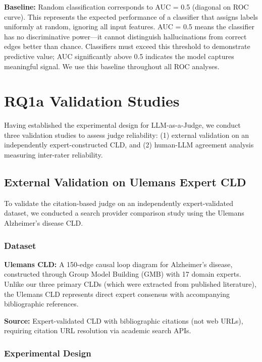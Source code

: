 \textbf{Baseline:} Random classification corresponds to AUC = 0.5 (diagonal on ROC curve). This represents the expected performance of a classifier that assigns labels uniformly at random, ignoring all input features. AUC = 0.5 means the classifier has no discriminative power---it cannot distinguish hallucinations from correct edges better than chance. Classifiers must exceed this threshold to demonstrate predictive value; AUC significantly above 0.5 indicates the model captures meaningful signal. We use this baseline throughout all ROC analyses.

\section{RQ1a Validation Studies}

Having established the experimental design for LLM-as-a-Judge, we conduct three validation studies to assess judge reliability: (1) external validation on an independently expert-constructed CLD, and (2) human-LLM agreement analysis measuring inter-rater reliability.

\subsection{External Validation on Ulemans Expert CLD}

To validate the citation-based judge on an independently expert-validated dataset, we conducted a search provider comparison study using the Ulemans Alzheimer's disease CLD.

\subsubsection{Dataset}

\textbf{Ulemans CLD:} A 150-edge causal loop diagram for Alzheimer's disease, constructed through Group Model Building (GMB) with 17 domain experts. Unlike our three primary CLDs (which were extracted from published literature), the Ulemans CLD represents direct expert consensus with accompanying bibliographic references.

\textbf{Source:} Expert-validated CLD with bibliographic citations (not web URLs), requiring citation URL resolution via academic search APIs.

\subsubsection{Experimental Design}

